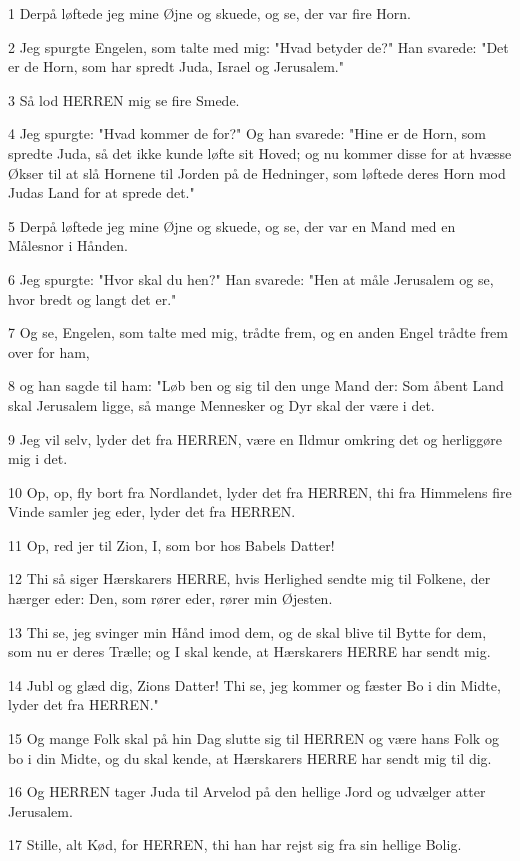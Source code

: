 \par 1 Derpå løftede jeg mine Øjne og skuede, og se, der var fire Horn.
\par 2 Jeg spurgte Engelen, som talte med mig: "Hvad betyder de?" Han svarede: "Det er de Horn, som har spredt Juda, Israel og Jerusalem."
\par 3 Så lod HERREN mig se fire Smede.
\par 4 Jeg spurgte: "Hvad kommer de for?" Og han svarede: "Hine er de Horn, som spredte Juda, så det ikke kunde løfte sit Hoved; og nu kommer disse for at hvæsse Økser til at slå Hornene til Jorden på de Hedninger, som løftede deres Horn mod Judas Land for at sprede det."
\par 5 Derpå løftede jeg mine Øjne og skuede, og se, der var en Mand med en Målesnor i Hånden.
\par 6 Jeg spurgte: "Hvor skal du hen?" Han svarede: "Hen at måle Jerusalem og se, hvor bredt og langt det er."
\par 7 Og se, Engelen, som talte med mig, trådte frem, og en anden Engel trådte frem over for ham,
\par 8 og han sagde til ham: "Løb ben og sig til den unge Mand der: Som åbent Land skal Jerusalem ligge, så mange Mennesker og Dyr skal der være i det.
\par 9 Jeg vil selv, lyder det fra HERREN, være en Ildmur omkring det og herliggøre mig i det.
\par 10 Op, op, fly bort fra Nordlandet, lyder det fra HERREN, thi fra Himmelens fire Vinde samler jeg eder, lyder det fra HERREN.
\par 11 Op, red jer til Zion, I, som bor hos Babels Datter!
\par 12 Thi så siger Hærskarers HERRE, hvis Herlighed sendte mig til Folkene, der hærger eder: Den, som rører eder, rører min Øjesten.
\par 13 Thi se, jeg svinger min Hånd imod dem, og de skal blive til Bytte for dem, som nu er deres Trælle; og I skal kende, at Hærskarers HERRE har sendt mig.
\par 14 Jubl og glæd dig, Zions Datter! Thi se, jeg kommer og fæster Bo i din Midte, lyder det fra HERREN."
\par 15 Og mange Folk skal på hin Dag slutte sig til HERREN og være hans Folk og bo i din Midte, og du skal kende, at Hærskarers HERRE har sendt mig til dig.
\par 16 Og HERREN tager Juda til Arvelod på den hellige Jord og udvælger atter Jerusalem.
\par 17 Stille, alt Kød, for HERREN, thi han har rejst sig fra sin hellige Bolig.

